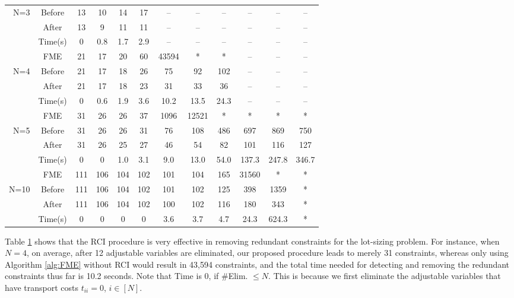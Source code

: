 \documentclass[fleqn,mnsc,blindrev]{informs4}
\begin{document}
\begin{example}
\begin{table}[t]
\begin{tabular}{rc|cccccccccc}
\multirow{2}{*}{N=3}	   & Before & 13    & 10    & 14    & 17   & --     & --      &  --      &  --      &  --      &  --  \\
& After & 13    & 9     & 11    & 11   & --     & --      &  --      &  --      &  --      &  --  \\
& Time(s)  & 0   & 0.8   & 1.7   & 2.9  & --     & --      &  --      &  --      &  --      &  --  \\ \cline{2-12}
& FME   & 21    & 17    & 20    & 60    & 43594 & *   & *  & --      &  --      &  --  \\ 
\multirow{2}{*}{N=4} & Before & 21    & 17    & 18    & 26    & 75    & 92    & 102   & --      &  --      &  -- \\ 
					& After & 21    & 17    & 18    & 23    & 31    & 33    & 36    & --      &  --      &  --  \\
					&  Time(s) & 0     & 0.6    & 1.9   &   3.6   & 10.2   & 13.5  & 24.3  & --     & --     & -- \\ \cline{2-12}
					& FME   & 31    & 26    & 26    & 37    & 1096  & 12521 & *   & *   & *   & * \\ 
					\multirow{2}{*}{N=5} & Before & 31    & 26    & 26    & 31    & 76    &    108   & 486   & 697   & 869   & 750 \\ 
					& After & 31    & 26    & 25    & 27    & 46    &    54   & 82    & 101   & 116   & 127 \\
					& Time(s) & 0     & 0     & 1.0   & 3.1     & 9.0   & 13.0  & 54.0  & 137.3 & 247.8 & 346.7 \\	\cline{2-12}
					& FME   & 111   & 106   & 104   & 102   & 101   & 104   & 165   & 31560 & *   & * \\  
					\multirow{2}{*}{N=10}  & Before & 111   & 106   & 104   & 102   & 101   & 102   & 125   & 398   & 1359  & * \\
					& After & 111   & 106   & 104   & 102   & 100   & 102   & 116   & 180   & 343   & * \\
					&  Time(s)  & 0     & 0  & 0  & 0  & 3.6   & 3.7   & 4.7   & 24.3  & 624.3 & * \\ 	 \cline{2-12}
				\end{tabular}%
				\label{tab:LSONP}
			\end{table}%
			Table \ref{tab:LSONP} shows that the RCI procedure is very effective in removing redundant constraints for the lot-sizing problem. For instance, when $N=4$, on average, after 12 adjustable variables are eliminated, our proposed procedure leads to merely 31 constraints, whereas only using Algorithm \ref{alg:FME} without RCI would result in 43,594 constraints, and the total time needed for detecting and removing the redundant constraints thus far is 10.2 seconds. Note that Time is 0, if \#Elim. $\le N$. This is because we first eliminate the adjustable variables that have transport costs $t_{ii}=0$, $i\in [N]$.
			 
			 \hfill \Halmos 
		\end{example}
		
\end{document}
